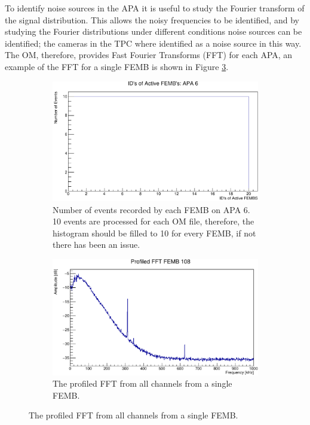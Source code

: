To identify noise sources in the APA it is useful to study the Fourier transform
of the signal distribution. This allows the noisy frequencies to be identified,
and by studying the Fourier distributions under different conditions noise
sources can be identified; the cameras in the TPC where identified as a noise 
source in this way. The OM, therefore, provides Fast Fourier Transforms (FFT) 
for each APA, an example of the FFT for a single FEMB is shown in Figure 
\ref{fig:TPC_FFT}.

\begin{figure}

	\centering

	\begin{subfigure}[b]{0.75\textwidth}
		\centering
		\includegraphics[width=\textwidth]{figures/active_femb.pdf}
		\caption {Number of events recorded by each FEMB on APA 6. 10 events are
		processed for each OM file, therefore, the histogram should be filled to 10
		for every FEMB, if not there has been an issue.}
		\label{fig:active_femb}
	\end{subfigure}

	\begin{subfigure}[b]{0.75\textwidth}
		\centering
		\vspace{3mm}
		\includegraphics[width=\textwidth]{figures/tpc_fft.pdf}
		\caption {The profiled FFT from all channels from a single FEMB.}
		\label{fig:TPC_FFT}
	\end{subfigure}


\end{figure}

